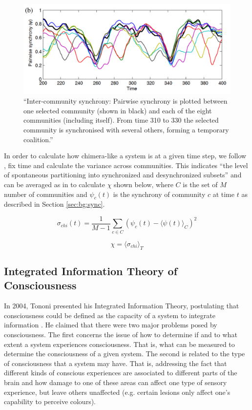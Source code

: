 \documentclass[a4paper,11pt]{article}
\begin{document}
\begin{figure}[H]
\centering
\includegraphics[scale = 0.5]{Shanahan2010_Chimera}
\caption{``Inter-community synchrony: Pairwise synchrony is plotted between one selected community (shown in black) and each of the eight communities (including itself). From time 310 to 330 the selected community is synchronised with several others, forming a temporary coalition.'' \cite{Shanahan2010}}
\label{Shanahan2010_Chimera}
\end{figure}

In order to calculate how chimera-like a system is at a given time step, we follow \cite{Shanahan2010, Bhowmik2013}, fix time and calculate the variance across communities. This indicates ``the level of spontaneous partitioning into synchronized and desynchronized subsets'' \cite{Bhowmik2013} and can be averaged as in \cite{Shanahan2010} to calculate $\chi$ shown below, where $C$ is the set of $M$ number of communities and $\psi_c(t)$ is the synchrony of community $c$ at time $t$ as described in Section \ref{sec:bg:sync}.

\begin{equation} \label{eq:var-sync}
\sigma_{chi}(t) = \frac{1}{M - 1}\sum_{c \in C}(\psi_c(t) - \langle \psi(t) \rangle_C)^2
\end{equation}

\begin{equation} \label{eq:chi}
\chi = \langle \sigma_{chi} \rangle_T
\end{equation}

\subsection{Integrated Information Theory of Consciousness}
In 2004, Tononi presented his Integrated Information Theory, postulating that consciousness could be defined as the capacity of a system to integrate information \cite{Tononi2004}. He claimed that there were two major problems posed by consciousness. The first concerns the issue of how to determine if and to what extent a system experiences consciousness. That is, what can be measured to determine the consciousness of a given system. The second is related to the type of consciousness that a system may have. That is, addressing the fact that different kinds of conscious experiences are associated to different parts of the brain and how damage to one of these areas can affect one type of sensory experience, but leave others unaffected (e.g. certain lesions only affect one's capability to perceive colours).
\end{document}
